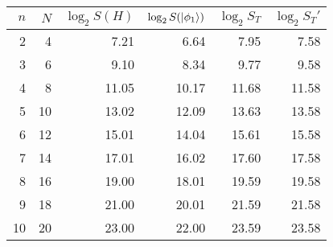\begin{tabular}{rrrrrr}
\toprule
   $n$ &   $N$ &   $\log_2 S(H)$ &   $\log_2 S(\ket{\phi_1})$ &   $\log_2 S_T$ &   $\log_2 S_T'$ \\
\midrule
     2 &     4 &            7.21 &                       6.64 &           7.95 &            7.58 \\
     3 &     6 &            9.10 &                       8.34 &           9.77 &            9.58 \\
     4 &     8 &           11.05 &                      10.17 &          11.68 &           11.58 \\
     5 &    10 &           13.02 &                      12.09 &          13.63 &           13.58 \\
     6 &    12 &           15.01 &                      14.04 &          15.61 &           15.58 \\
     7 &    14 &           17.01 &                      16.02 &          17.60 &           17.58 \\
     8 &    16 &           19.00 &                      18.01 &          19.59 &           19.58 \\
     9 &    18 &           21.00 &                      20.01 &          21.59 &           21.58 \\
    10 &    20 &           23.00 &                      22.00 &          23.59 &           23.58 \\
\bottomrule
\end{tabular}